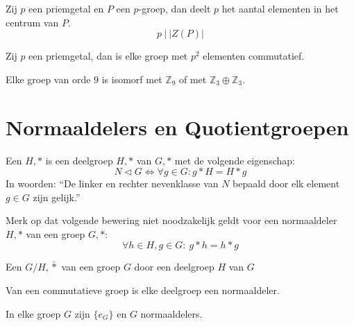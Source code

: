 \documentclass[main.tex]{subfiles}
\begin{document}
\begin{ei}
  Zij $p$ een priemgetal en $P$ een $p$-groep, dan deelt $p$ het aantal elementen in het centrum van $P$.
  \[ p\ |\ |Z(P)|\]

\end{ei}

\begin{st}
  Zij $p$ een priemgetal, dan is elke groep met $p^{2}$ elementen commutatief.

\end{st}

\begin{st}
  Elke groep van orde $9$ is isomorf met $\mathbb{Z}_{9}$ of met $\mathbb{Z}_{3} \oplus \mathbb{Z}_{3}$.
  
\end{st}

\section{Normaaldelers en Quotientgroepen}
\label{sec:normaaldelers-en-quotientgroepen}

\begin{de}
  Een  $H,*$ is een deelgroep $H,*$ van $G,*$ met de volgende eigenschap:
  \[ N \triangleleft G \Leftrightarrow \forall g \in G: g*H = H*g \]
  In woorden: ``De linker en rechter nevenklasse van $N$ bepaald door elk element $g\in G$ zijn gelijk.''
\end{de}

\begin{opm}
  Merk op dat volgende bewering niet noodzakelijk geldt voor een normaaldeler $H,*$ van een groep $G,*$:
  \[ \forall h \in H, g \in G:\ g*h = h*g \]
\end{opm}

\begin{de}
  Een  $G/H,\bar{*}$ van een groep $G$ door een deelgroep $H$ van $G$ 
\end{de}

\begin{st}
  Van een commutatieve groep is elke deelgroep een normaaldeler.
  
\end{st}

\begin{st}
  In elke groep $G$ zijn $\{e_{G}\}$ en $G$ normaaldelers.
  
\end{st}
\end{document}
